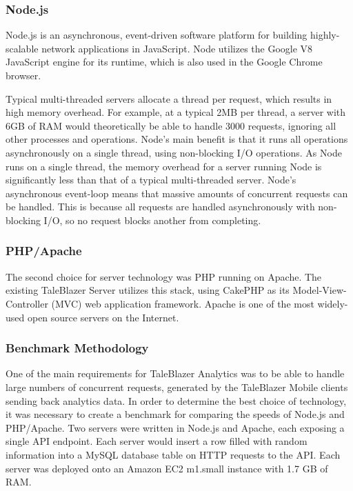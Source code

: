 \subsubsection{Node.js}

Node.js is an asynchronous, event-driven software platform for building highly-scalable network applications in JavaScript. Node utilizes the Google V8 JavaScript engine for its runtime, which is also used in the Google Chrome browser. 

Typical multi-threaded servers allocate a thread per request, which results in high memory overhead. For example, at a typical 2MB per thread, a server with 6GB of RAM would theoretically be able to handle 3000 requests, ignoring all other processes and operations. Node's main benefit is that it runs all operations asynchronously on a single thread, using non-blocking I/O operations. As Node runs on a single thread, the memory overhead for a server running Node is significantly less than that of a typical multi-threaded server. Node's asynchronous event-loop means that massive amounts of concurrent requests can be handled. This is because all requests are handled asynchronously with non-blocking I/O, so no request blocks another from completing. \cite{site:event-loop}

\subsubsection{PHP/Apache}

The second choice for server technology was PHP running on Apache. The existing TaleBlazer Server utilizes this stack, using CakePHP as its Model-View-Controller (MVC) web application framework. Apache is one of the most widely-used open source servers on the Internet.

\subsubsection{Benchmark Methodology}

One of the main requirements for TaleBlazer Analytics was to be able to handle large numbers of concurrent requests, generated by the TaleBlazer Mobile clients sending back analytics data. In order to determine the best choice of technology, it was necessary to create a benchmark for comparing the speeds of Node.js and PHP/Apache. Two servers were written in Node.js and Apache, each exposing a single API endpoint. Each server would insert a row filled with random information into a MySQL database table on HTTP requests to the API. 
Each server was deployed onto an Amazon EC2 m1.small instance with 1.7 GB of RAM. 

